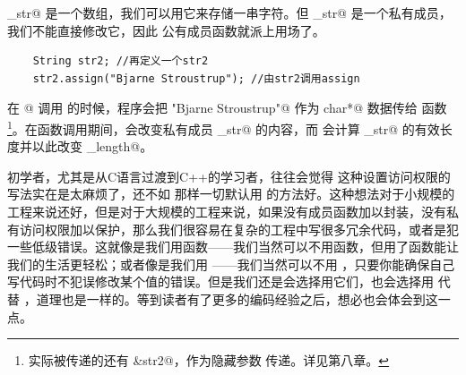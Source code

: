 \lstinline@_str@ 是一个数组，我们可以用它来存储一串字符。但 \lstinline@_str@ 是一个私有成员，我们不能直接修改它，因此 \lstinline@assign@ 公有成员函数就派上用场了。
\begin{lstlisting}
    String str2; //再定义一个str2
    str2.assign("Bjarne Stroustrup"); //由str2调用assign
\end{lstlisting}
在 @ 调用 \lstinline@assign@ 的时候，程序会把 \lstinline@"Bjarne Stroustrup"@ 作为 \lstinline@const char*@ 数据传给 \lstinline@assign@ 函数\footnote{实际被传递的还有 \lstinline@&str2@，作为隐藏参数 \lstinline@this@ 传递。详见第八章。}。在函数调用期间，\lstinline@strncpy@ 会改变私有成员 \lstinline@_str@ 的内容，而 \lstinline@strlen@ 会计算 \lstinline@_str@ 的有效长度并以此改变 \lstinline@_length@。\par
初学者，尤其是从C语言过渡到C++的学习者，往往会觉得 \lstinline@class@ 这种设置访问权限的写法实在是太麻烦了，还不如 \lstinline@struct@ 那样一切默认用 \lstinline@public@ 的方法好。这种想法对于小规模的工程来说还好，但是对于大规模的工程来说，如果没有成员函数加以封装，没有私有访问权限加以保护，那么我们很容易在复杂的工程中写很多冗余代码，或者是犯一些低级错误。这就像是我们用函数——我们当然可以不用函数，但用了函数能让我们的生活更轻松；或者像是我们用 \lstinline@const@——我们当然可以不用 \lstinline@const@，只要你能确保自己写代码时不犯误修改某个值的错误。但是我们还是会选择用它们，也会选择用 \lstinline@class@ 代替 \lstinline@struct@，道理也是一样的。等到读者有了更多的编码经验之后，想必也会体会到这一点。\par
